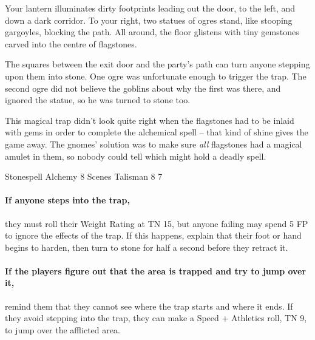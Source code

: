 \begin{multicols}{2}
\begin{itemize}
\end{itemize}


\begin{boxtext}

	Your lantern illuminates dirty footprints leading out the door, to the left, and down a dark corridor.
	To your right, two statues of ogres stand, like stooping gargoyles, blocking the path.
	All around, the floor glistens with tiny gemstones carved into the centre of flagstones.

\end{boxtext}

The squares between the exit door and the party's path can turn anyone stepping upon them into stone.
One ogre was unfortunate enough to trigger the trap.
The second ogre did not believe the goblins about why the first was there, and ignored the statue, so he was turned to stone too.

This magical trap didn't look quite right when the flagstones had to be inlaid with gems in order to complete the alchemical spell -- that kind of shine gives the game away.
The gnomes' solution was to make sure \textit{all} flagstones had a magical amulet in them, so nobody could tell which might hold a deadly spell.

	{Stonespell}%
	{Alchemy}%
	{8 Scenes}%
	{Talisman}%
	{8}%
	{7}%

\paragraph{If anyone steps into the trap,}
they must roll their Weight Rating at TN 15, but anyone failing may spend 5 FP to ignore the effects of the trap.
If this happens, explain that their foot or hand begins to harden, then turn to stone for half a second before they retract it.

\paragraph{If the players figure out that the area is trapped and try to jump over it,}
remind them that they cannot see where the trap starts and where it ends.
If they avoid stepping into the trap, they can make a Speed + Athletics roll, TN 9, to jump over the afflicted area.


\begin{boxtext}


\end{boxtext}
\end{multicols}
